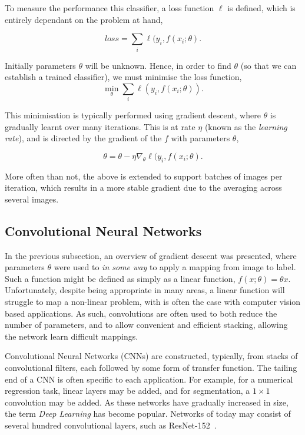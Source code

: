 \noindent To measure the performance this classifier, a loss function
$\ell$ is defined, which is entirely dependant on the problem at hand,

\begin{equation}
  loss = \sum_i \ell(y_i, f(x_i ; \theta) .
\end{equation}


\noindent Initially parameters $\theta$ will be unknown. Hence, in
order to find $\theta$ (so that we can establish a trained
classifier), we must minimise the loss function,
\begin{equation}
  \min_\theta \sum_i \ell(y_i, f(x_i ; \theta)) .
\end{equation}



\noindent This minimisation is typically performed using gradient
descent, where $\theta$ is gradually learnt over many iterations. This
is at rate $\eta$ (known as the \textit{learning rate}), and is
directed by the gradient of the $f$ with parameters $\theta$,

\begin{equation}
  \theta = \theta - \eta \nabla_\theta \ell(y_i, f(x_i ; \theta) .
\end{equation}

More often than not, the above is extended to support batches of
images per iteration, which results in a more stable gradient due to
the averaging across several images.

\subsection{Convolutional Neural Networks}

In the previous subsection, an overview of gradient descent was
presented, where parameters $\theta$ were used to \textit{in some way}
to apply a mapping from image to label. Such a function might be
defined as simply as a linear function, $f(x;\theta) = \theta
x$. Unfortunately, despite being appropriate in many areas, a linear
function will struggle to map a non-linear problem, with is often the
case with computer vision based applications. As such, convolutions
are often used to both reduce the number of parameters, and to allow
convenient and efficient stacking, allowing the network learn
difficult mappings.

Convolutional Neural Networks (CNNs) are constructed, typically, from
stacks of convolutional filters, each followed by some form of
transfer function. The tailing end of a CNN is often specific to each
application. For example, for a numerical regression task, linear
layers may be added, and for segmentation, a $1\times 1$ convolution
may be added. As these networks have gradually increased in size, the
term \textit{Deep Learning} has become popular. Networks of today may
consist of several hundred convolutional layers, such as
ResNet-152~\cite{he2015deep}.

